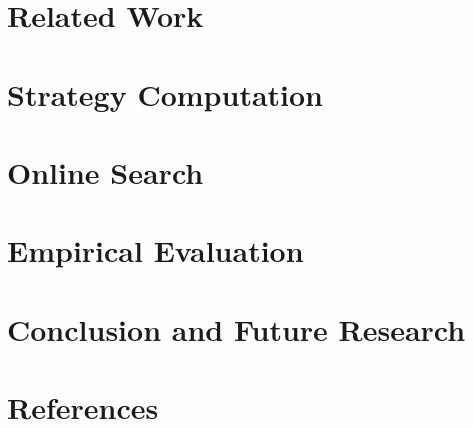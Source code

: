\documentclass[preprint,12pt]{elsarticle}
\newcommand{\reviewchange}[1]{{\color{blue}#1}}
\newcounter{bbNoteCounter}
\newcommand{\bbosansky}[1]{{\small \color{orange} $\blacktriangle$ \refstepcounter{bbNoteCounter}\textsf{[BB]$_{\arabic{bbNoteCounter}}$:{#1}}}}
\begin{document}


\section{Related Work} \label{sec:relwork}



\section{Strategy Computation} \label{sec:offline}



\section{Online Search} \label{sec:online}




\section{Empirical Evaluation} \label{sec:eval}



\section{Conclusion and Future Research} \label{sec:conc}




\section*{References}











\end{document}
